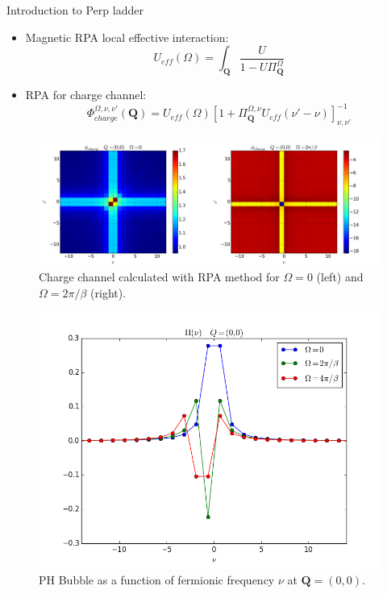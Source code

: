 Introduction to Perp ladder

\begin{itemize}

\item Magnetic RPA local effective interaction:
\begin{equation}
  U_{eff}(\Omega) =\int_{\boldsymbol{Q}} \frac{U}{ 1 - U \Pi^{\Omega}_{\boldsymbol{Q}} }
\end{equation}

\item RPA for charge channel:
\begin{equation}
  \Phi_{charge}^{\Omega,\nu,\nu'}(\boldsymbol{Q}) = U_{eff}(\Omega) 
  \left[ 1+  \Pi^{\Omega,\nu}_{\boldsymbol{Q}} U_{eff}(\nu'-\nu) \right]_{\nu,\nu'}^{-1}
\end{equation}

\end{itemize}

\begin{figure}
\includegraphics[scale=0.25]{images/Perp_ladder_density.png}
\caption{Charge channel calculated with RPA method for $\Omega=0$ (left) and $\Omega=2\pi/\beta$ (right). }
 \label{Perpladder}
\end{figure}

\begin{figure}
\includegraphics[scale=0.7]{images/Bubble_ph.png}
\caption{PH Bubble as a function of fermionic frequency $\nu$ at $\boldsymbol{Q}=(0,0)$. }
 \label{Perpladder}
\end{figure}